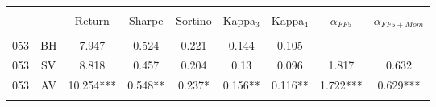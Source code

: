 \begin{tabular}{@{\extracolsep{5pt}} Hcccccccc} 
	\\[-1.8ex]\hline 
	\hline \\[-1.8ex] 
	 &  & Return & Sharpe & Sortino & Kappa$_{3}$ & Kappa$_{4}$ & $\alpha_{FF5}$ & $\alpha_{FF5+Mom}$ \\ 
	\hline \\[-1.8ex] 
	053 & BH & 7.947 & 0.524 & 0.221 & 0.144 & 0.105 & &  \\ 
	053 & SV & 8.818 & 0.457 & 0.204 & 0.13 & 0.096 &  1.817 & 0.632 \\ 
	053 & AV & 10.254*** & 0.548** & 0.237* & 0.156** & 0.116** &  1.722*** & 0.629*** \\ 
\hline \\[-1.8ex] 
\end{tabular} 